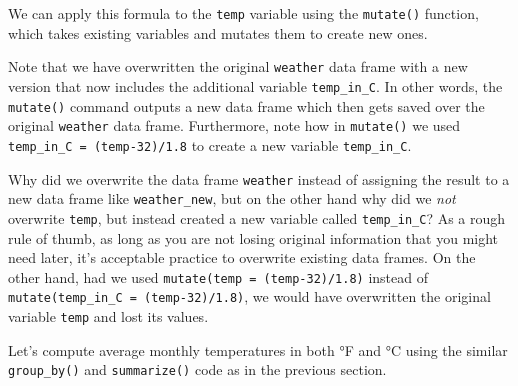 \documentclass[12pt, krantz2,]{krantz}
\makeatletter
\newenvironment{Shaded}{\begin{snugshade}}{\end{snugshade}}
\newcommand{\DataTypeTok}[1]{\textcolor[rgb]{0.27,0.27,0.27}{#1}}
\newcommand{\DecValTok}[1]{\textcolor[rgb]{0.06,0.06,0.06}{#1}}
\newcommand{\FloatTok}[1]{\textcolor[rgb]{0.06,0.06,0.06}{#1}}
\newcommand{\KeywordTok}[1]{\textcolor[rgb]{0.27,0.27,0.27}{\textbf{#1}}}
\newcommand{\NormalTok}[1]{#1}
\newcommand{\OperatorTok}[1]{\textcolor[rgb]{0.43,0.43,0.43}{\textbf{#1}}}
\newcommand{\OtherTok}[1]{\textcolor[rgb]{0.37,0.37,0.37}{#1}}
\newcommand{\StringTok}[1]{\textcolor[rgb]{0.5,0.5,0.5}{#1}}
\newenvironment{kframe}{%
\medskip{}
\setlength{\fboxsep}{.8em}
 \def\at@end@of@kframe{}%
 \ifinner\ifhmode%
  \def\at@end@of@kframe{\end{minipage}}%
  \begin{minipage}{\columnwidth}%
 \fi\fi%
 \def\FrameCommand##1{\hskip\@totalleftmargin \hskip-\fboxsep
 \colorbox{shadecolor}{##1}\hskip-\fboxsep
     \hskip-\linewidth \hskip-\@totalleftmargin \hskip\columnwidth}%
 \MakeFramed {\advance\hsize-\width
   \@totalleftmargin\z@ \linewidth\hsize
   \@setminipage}}%
 {\par\unskip\endMakeFramed%
 \at@end@of@kframe}
\renewenvironment{Shaded}{\begin{kframe}}{\end{kframe}}
\makeatother
\begin{document}
We can apply this formula to the \texttt{temp} variable using the \texttt{mutate()} function, which takes existing variables and mutates them to create new ones.

\begin{Shaded}
\end{Shaded}

Note that we have overwritten the original \texttt{weather} data frame with a new version that now includes the additional variable \texttt{temp\_in\_C}. In other words, the \texttt{mutate()} command outputs a new data frame which then gets saved over the original \texttt{weather} data frame. Furthermore, note how in \texttt{mutate()} we used \texttt{temp\_in\_C\ =\ (temp-32)/1.8} to create a new variable \texttt{temp\_in\_C}.

Why did we overwrite the data frame \texttt{weather} instead of assigning the result to a new data frame like \texttt{weather\_new}, but on the other hand why did we \emph{not} overwrite \texttt{temp}, but instead created a new variable called \texttt{temp\_in\_C}? As a rough rule of thumb, as long as you are not losing original information that you might need later, it's acceptable practice to overwrite existing data frames. On the other hand, had we used \texttt{mutate(temp\ =\ (temp-32)/1.8)} instead of \texttt{mutate(temp\_in\_C\ =\ (temp-32)/1.8)}, we would have overwritten the original variable \texttt{temp} and lost its values.

Let's compute average monthly temperatures in both °F and °C using the similar \texttt{group\_by()} and \texttt{summarize()} code as in the previous section.

\begin{Shaded}
\end{Shaded}
\end{document}
